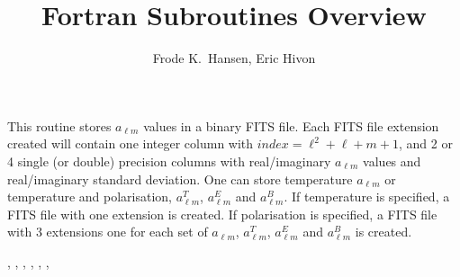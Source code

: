 
\sloppy


\title{\healpix Fortran Subroutines Overview}
 \section[alms2fits*]{ }
\label{sub:alms2fits}
\author{Frode K.~Hansen, Eric Hivon}

\begin{facility}
{This routine stores  $a_{\ell m}$  values in a binary FITS file. Each FITS file
  extension created will contain one integer column with
  $index=\ell^2+\ell+m+1$, and 2 or 4 single (or double) precision columns with real/imaginary  $a_{\ell m}$  values and real/imaginary   standard deviation. One can store temperature $a_{\ell m}$ or temperature and polarisation, $a^T_{\ell m}$, $a^E_{\ell m}$ and $a^B_{\ell m}$. If temperature is specified, a FITS file with one extension is created. If polarisation is specified, a FITS file with 3 extensions one for each set of $a_{\ell m}$, $a_{\ell m}^T$, $a_{\ell m}^E$ and $a_{\ell m}^B$ is created.}
{\modFitstools}
\end{facility}

\begin{f90format}
{%
, %
, %
, %
, %
, %
, %
}
\end{f90format}

